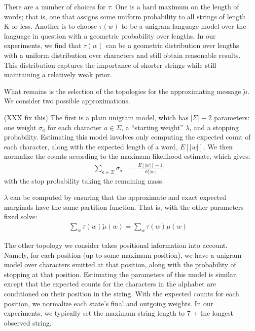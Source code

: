 \documentclass[11pt,a4paper]{article}
\begin{document}
There are a number of choices for $\tau$. One is a hard maximum on
the length of words; that is, one that assigns some uniform probability
to all strings of length K or less. Another is to choose $\tau(w)$
to be a unigram language model over the language in question with
a geometric probability over lengths. In our experiments, we find
that $\tau(w)$ can be a geometric distribution over lengths with a
uniform distribution over characters and still obtain reasonable
results.  This distribution captures the importance of shorter
strings while still maintaining a relatively weak prior.

What remains is the selection of the topologies for the approximating
message $\tilde\mu$. We consider two possible approximations. 

(XXX fix this)
The
first is a plain unigram model, which has $|\Sigma|+2$ parameters:
one weight $\sigma_a$ for each character $a \in \Sigma$, a ``starting weight'' $\lambda$, and
a stopping probability. Estimating this model involves only computing
the expected count of each character, along with the expected
length of a word, $E[|w|]$. We then normalize the counts according
to the maximum likelihood estimate, which gives:
\begin{equation}
  \begin{split}
    \sum_{a\in\Sigma} \sigma_a &= \frac{E[|w|]-1}{E[|w|}
   \end{split}
 \end{equation}
with the stop probability taking the remaining mass. 

$\lambda$ can be computed by ensuring that the
approximate and exact expected marginals have the same partition
function. That is, with the other parameters fixed solve:
\begin{equation*}
  \begin{split}
    \sum_w \tau(w) \tilde\mu(w) = \sum_w \tau(w) \mu(w)
  \end{split}
\end{equation*}

The other topology we consider takes positional information into
account. Namely, for each position (up to some maximum position),
we have a unigram model over characters emitted at that position,
along with the probability of stopping at that position. Estimating
the parameters of this model is similar, except that the expected
counts for the characters in the alphabet are conditioned on their
position in the string. With the expected counts for each position,
we normalize each state's final and outgoing weights. In our
experiments, we typically set the maximum string length to 7 + the
longest observed string.
\end{document}
